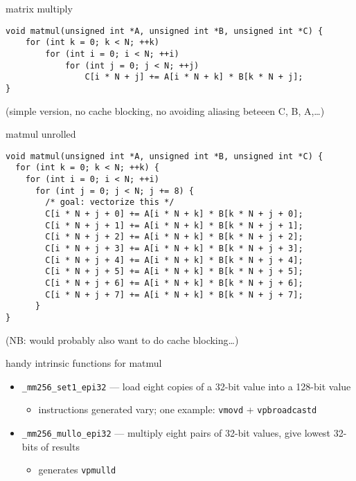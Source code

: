 
\begin{frame}[fragile,label=mmSerial]{matrix multiply}
\lstset{language=C,style=small}
\begin{lstlisting}
void matmul(unsigned int *A, unsigned int *B, unsigned int *C) {
    for (int k = 0; k < N; ++k)
        for (int i = 0; i < N; ++i)
            for (int j = 0; j < N; ++j)
                C[i * N + j] += A[i * N + k] * B[k * N + j];
}
\end{lstlisting}
(simple version, no cache blocking, no avoiding aliasing beteeen C, B, A,\ldots)
\end{frame}

\begin{frame}[fragile,label=sqSerialUnrolled]{matmul unrolled}
\lstset{language=C,style=smaller}
\begin{lstlisting}
void matmul(unsigned int *A, unsigned int *B, unsigned int *C) {
  for (int k = 0; k < N; ++k) {
    for (int i = 0; i < N; ++i)
      for (int j = 0; j < N; j += 8) {
        /* goal: vectorize this */
        C[i * N + j + 0] += A[i * N + k] * B[k * N + j + 0];
        C[i * N + j + 1] += A[i * N + k] * B[k * N + j + 1];
        C[i * N + j + 2] += A[i * N + k] * B[k * N + j + 2];
        C[i * N + j + 3] += A[i * N + k] * B[k * N + j + 3];
        C[i * N + j + 4] += A[i * N + k] * B[k * N + j + 4];
        C[i * N + j + 5] += A[i * N + k] * B[k * N + j + 5];
        C[i * N + j + 6] += A[i * N + k] * B[k * N + j + 6];
        C[i * N + j + 7] += A[i * N + k] * B[k * N + j + 7];
      }
}
\end{lstlisting}
(NB: would probably also want to do cache blocking\ldots)
\end{frame}

\begin{frame}[fragile,label=sqVectInstr]{handy intrinsic functions for matmul}
    \begin{itemize}
        \item {\tt \_mm256\_set1\_epi32} --- load eight copies of a 32-bit value into a 128-bit value
            \begin{itemize}
            \item instructions generated vary; one example: {\tt vmovd} + {\tt vpbroadcastd}
            \end{itemize}
        \item {\tt \_mm256\_mullo\_epi32} --- multiply eight pairs of 32-bit values, give lowest 32-bits of results
            \begin{itemize}
            \item generates {\tt vpmulld}
            \end{itemize}
    \end{itemize}
\end{frame}

